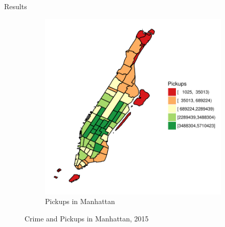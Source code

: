 \documentclass[10pt,ignorenonframetext,]{beamer}
\begin{document}
\begin{frame}{%
\protect\hypertarget{results}{%
Results}}
\begin{itemize}
\begin{figure}
\begin{subfigure}[t]{0.45\textwidth}
        \includegraphics[width=1\textwidth]{../img/taxis_2015_Manhattan}
        \caption{Pickups in Manhattan}
    \end{subfigure}
    \caption{Crime and Pickups in Manhattan, 2015}
  \end{figure}
\end{itemize}

\end{frame}
\end{document}
